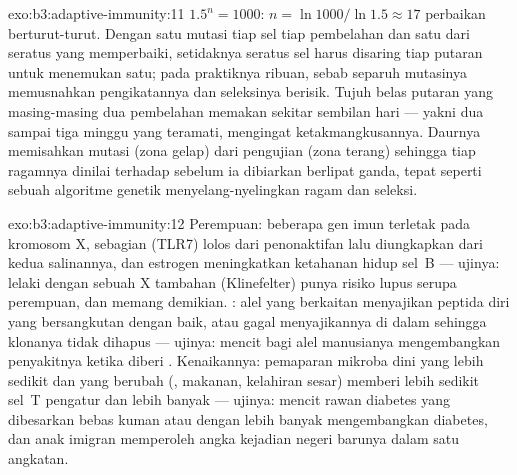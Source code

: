 \begin{solution}{exo:b3:adaptive-immunity:11}
$1.5^{n} = 1000$: $n = \ln 1000/\ln 1.5 \approx 17$ perbaikan
berturut-turut. Dengan satu mutasi tiap sel tiap pembelahan dan satu dari
seratus yang memperbaiki, setidaknya seratus sel harus disaring tiap putaran
untuk menemukan satu; pada praktiknya ribuan, sebab separuh mutasinya memusnahkan
pengikatannya dan seleksinya berisik. Tujuh belas putaran yang masing-masing dua pembelahan
memakan sekitar sembilan hari --- yakni dua sampai tiga minggu yang teramati, mengingat
ketakmangkusannya. Daurnya memisahkan mutasi (zona gelap) dari pengujian
(zona terang) sehingga tiap ragamnya dinilai terhadap  sebelum ia
dibiarkan berlipat ganda, tepat seperti sebuah algoritme genetik menyelang-nyelingkan
ragam dan seleksi.
\end{solution}

\begin{solution}{exo:b3:adaptive-immunity:12}
Perempuan: beberapa gen imun terletak pada kromosom X, sebagian (TLR7)
lolos dari penonaktifan lalu diungkapkan dari kedua salinannya, dan estrogen
meningkatkan ketahanan hidup sel~B --- ujinya: lelaki dengan sebuah X tambahan (Klinefelter)
punya risiko lupus serupa perempuan, dan memang demikian. : alel
yang berkaitan menyajikan peptida diri yang bersangkutan dengan baik, atau gagal menyajikannya
di dalam  sehingga klonanya tidak dihapus --- ujinya: mencit
 bagi alel manusianya mengembangkan penyakitnya ketika diberi
. Kenaikannya: pemaparan mikroba dini yang lebih sedikit dan
 yang berubah (, makanan, kelahiran sesar) memberi lebih sedikit sel~T
pengatur dan lebih banyak  --- ujinya: mencit rawan diabetes yang dibesarkan
bebas kuman atau dengan  lebih banyak mengembangkan diabetes, dan anak
imigran memperoleh angka kejadian negeri barunya dalam satu
angkatan.
\end{solution}

